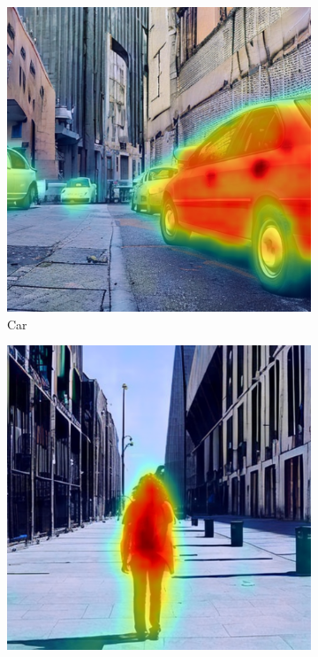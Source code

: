 \begin{figure}
\centering
  \begin{subfigure}{0.24\columnwidth}
   \includegraphics[width=\columnwidth]{img/4-experiments/dataset_example_daam_heatmap_car-full-optimized.png}
   \caption{Car}
   \label{subfig:dataset-example-car-daam-optimized}
  \end{subfigure}
  \begin{subfigure}{0.24\columnwidth}
   \includegraphics[width=\columnwidth]{img/4-experiments/dataset_example_daam_heatmap_person-full-optimized.png}

\end{subfigure}
\end{figure}
